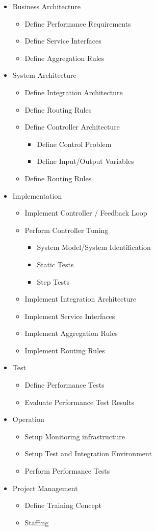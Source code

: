 \begin{itemize}
	\item Business Architecture
	\begin{itemize}
		\item Define Performance Requirements
		\item Define Service Interfaces
		\item Define Aggregation Rules
	\end{itemize}
	\item System Architecture 
	\begin{itemize}
		\item Define Integration Architecture
		\item Define Routing Rules
		\item Define Controller Architecture 
		\begin{itemize}
			\item Define Control Problem 
			\item Define Input/Output Variables 
		\end{itemize}
		\item Define Routing Rules
	\end{itemize}
	\item Implementation
	\begin{itemize}
		\item Implement Controller / Feedback Loop
		\item Perform Controller Tuning 
		\begin{itemize}
			\item System Model/System Identification 
			\item Static Tests
			\item Step Tests
		\end{itemize}
		\item Implement Integration Architecture
		\item Implement Service Interfaces
		\item Implement Aggregation Rules 
		\item Implement Routing Rules
	\end{itemize}
	\item Test
	\begin{itemize}
		\item Define Performance Tests 
		\item Evaluate Performance Test Results
	\end{itemize}
	\item Operation
	\begin{itemize}
		\item Setup Monitoring infrastructure
		\item Setup Test and Integration Environment
		\item Perform Performance Tests
	\end{itemize} 
	\item Project Management
	\begin{itemize}
		\item Define Training Concept
		\item Staffing
	\end{itemize}
\end{itemize}


